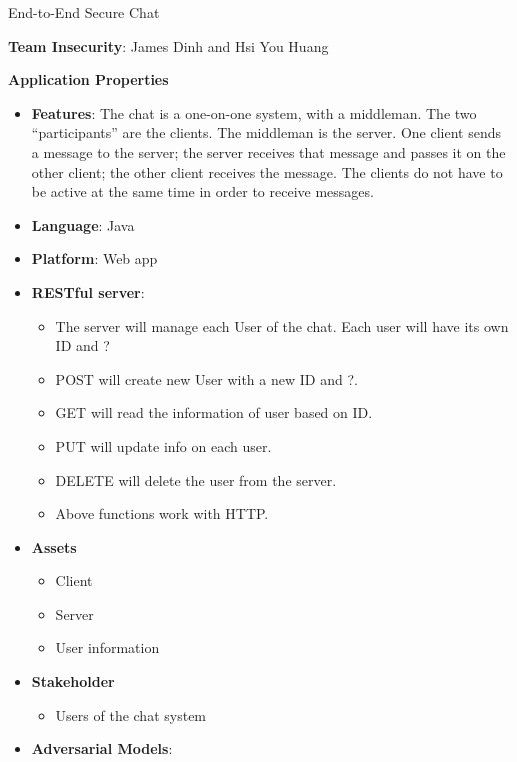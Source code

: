 \documentclass{article}
\begin{document}
End-to-End Secure Chat\newline

\textbf{Team Insecurity}: James Dinh and Hsi You Huang\newline

\textbf{Application Properties}\newline

\begin{itemize}
	\item \textbf{Features}: The chat is a one-on-one system, with a middleman. The two
     “participants” are the clients. The middleman is the server. One client sends a message to the
     server; the server receives that message and passes it on the other client; the other client 
     receives the message. The clients do not have to be active at the same time in order to receive
     messages.
	\item \textbf{Language}: Java
    \item \textbf{Platform}: Web app
    \item \textbf{RESTful server}:
    	\begin{itemize}
    		\item The server will manage each User of the chat. Each user will have its own ID and ?
         	\item POST will create new User with a new ID and ?.
            \item GET will read the information of user based on ID.
            \item PUT will update info on each user.
            \item DELETE will delete the user from the server.
            \item Above functions work with HTTP.
        \end{itemize}
	\item \textbf{Assets}
    	\begin{itemize}
        	\item Client
            \item Server
            \item User information
        \end{itemize} 
    \item \textbf{Stakeholder}
    	\begin{itemize}
        	\item Users of the chat system
        \end{itemize}
    \item \textbf{Adversarial Models}:
    	\begin {itemize}

\end{itemize}
\end{itemize}
\end{document}

